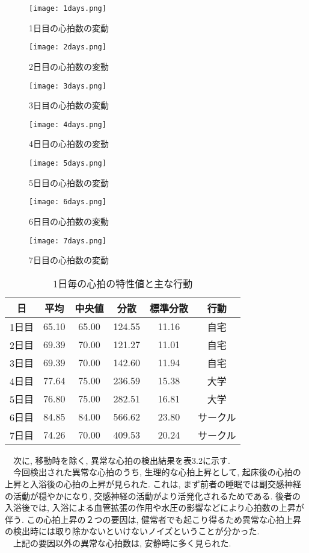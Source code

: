 \documentclass[report, 11pt, a4paper]{jsbook}
\begin{document}
\begin{figure}[H]
\centering
\texttt{[image: 1days.png]}
\caption{1日目の心拍数の変動}
\texttt{[image: 2days.png]}
\caption{2日目の心拍数の変動}
\texttt{[image: 3days.png]}
\caption{3日目の心拍数の変動}
\label{fig:goolge_trends}
\end{figure}

\begin{figure}[H]
\centering
\texttt{[image: 4days.png]}
\caption{4日目の心拍数の変動}
\texttt{[image: 5days.png]}
\caption{5日目の心拍数の変動}
\texttt{[image: 6days.png]}
\caption{6日目の心拍数の変動}
\label{fig:goolge_trends}
\end{figure}

\begin{figure}[H]
\centering
\texttt{[image: 7days.png]}
\caption{7日目の心拍数の変動}
\label{fig:goolge_trends}
\end{figure}

\begin{table}[H]
\centering
\caption{1日毎の心拍の特性値と主な行動}
\begin{tabular}{cccccc}
\hline
日  & 平均    & 中央値   & 分散     & 標準分散  & 行動   \\ \hline
1日目 & 65.10 & 65.00 & 124.55 & 11.16 & 自宅   \\
2日目 & 69.39 & 70.00 & 121.27 & 11.01 & 自宅   \\
3日目 & 69.39 & 70.00 & 142.60 & 11.94 & 自宅   \\
4日目 & 77.64 & 75.00 & 236.59 & 15.38 & 大学   \\
5日目 & 76.80 & 75.00 & 282.51 & 16.81 & 大学   \\
6日目 & 84.85 & 84.00 & 566.62 & 23.80 & サークル \\
7日目 & 74.26 & 70.00 & 409.53 & 20.24 & サークル \\ \hline
\end{tabular}
\end{table}

　次に, 移動時を除く, 異常な心拍の検出結果を表3.2に示す. \\
　今回検出された異常な心拍のうち, 生理的な心拍上昇として, 起床後の心拍の上昇と入浴後の心拍の上昇が見られた. これは, まず前者の睡眠では副交感神経の活動が穏やかになり, 交感神経の活動がより活発化されるためである. 後者の入浴後では, 入浴による血管拡張の作用や水圧の影響などにより心拍数の上昇が伴う. この心拍上昇の２つの要因は, 健常者でも起こり得るため異常な心拍上昇の検出時には取り除かないといけないノイズということが分かった. \\
　上記の要因以外の異常な心拍数は, 安静時に多く見られた. 
\end{document}
